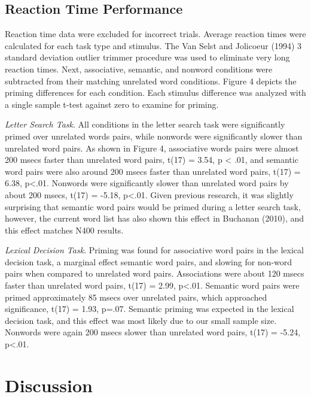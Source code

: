 \documentclass[english,man]{apa6}
\theoremstyle{definition}
\theoremstyle{definition}
\theoremstyle{definition}
\theoremstyle{remark}
\begin{document}
\subsection{Reaction Time Performance}\label{reaction-time-performance}

Reaction time data were excluded for incorrect trials. Average reaction
times were calculated for each task type and stimulus. The Van Selst and
Jolicoeur (1994) 3 standard deviation outlier trimmer procedure was used
to eliminate very long reaction times. Next, associative, semantic, and
nonword conditions were subtracted from their matching unrelated word
conditions. Figure 4 depicts the priming differences for each condition.
Each stimulus difference was analyzed with a single sample t-test
against zero to examine for priming.

\emph{Letter Search Task}. All conditions in the letter search task were
significantly primed over unrelated words pairs, while nonwords were
significantly slower than unrelated word pairs. As shown in Figure 4,
associative words pairs were almost 200 msecs faster than unrelated word
pairs, t(17) = 3.54, p \textless{} .01, and semantic word pairs were
also around 200 msecs faster than unrelated word pairs, t(17) = 6.38,
p\textless{}.01. Nonwords were significantly slower than unrelated word
pairs by about 200 msecs, t(17) = -5.18, p\textless{}.01. Given previous
research, it was slightly surprising that semantic word pairs would be
primed during a letter search task, however, the current word list has
also shown this effect in Buchanan (2010), and this effect matches N400
results.

\emph{Lexical Decision Task}. Priming was found for associative word
pairs in the lexical decision task, a marginal effect semantic word
pairs, and slowing for non-word pairs when compared to unrelated word
pairs. Associations were about 120 msecs faster than unrelated word
pairs, t(17) = 2.99, p\textless{}.01. Semantic word pairs were primed
approximately 85 msecs over unrelated pairs, which approached
significance, t(17) = 1.93, p=.07. Semantic priming was expected in the
lexical decision task, and this effect was most likely due to our small
sample size. Nonwords were again 200 msecs slower than unrelated word
pairs, t(17) = -5.24, p\textless{}.01.

\section{Discussion}\label{discussion}
\end{document}
